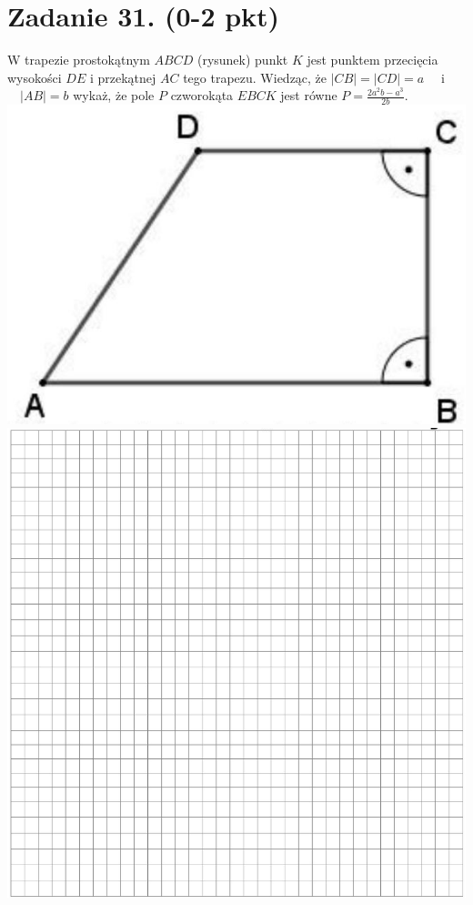 \documentclass[10pt]{article}
\begin{document}
\section*{Zadanie 31. (0-2 pkt)}
W trapezie prostokątnym \(A B C D\) (rysunek) punkt \(K\) jest punktem przecięcia wysokości \(D E\) i przekątnej \(A C\) tego trapezu. Wiedząc, że \(|C B|=|C D|=a \quad\) i \(\quad|A B|=b\) wykaż, że pole \(P\) czworokąta \(E B C K\) jest równe \(P=\frac{2 a^{2} b-a^{3}}{2 b}\).\\
\includegraphics[max width=\textwidth, center]{2024_11_21_832f1bc2b626663f1df2g-13}\\
\includegraphics[max width=\textwidth, center]{2024_11_21_832f1bc2b626663f1df2g-13(1)}
\end{document}

